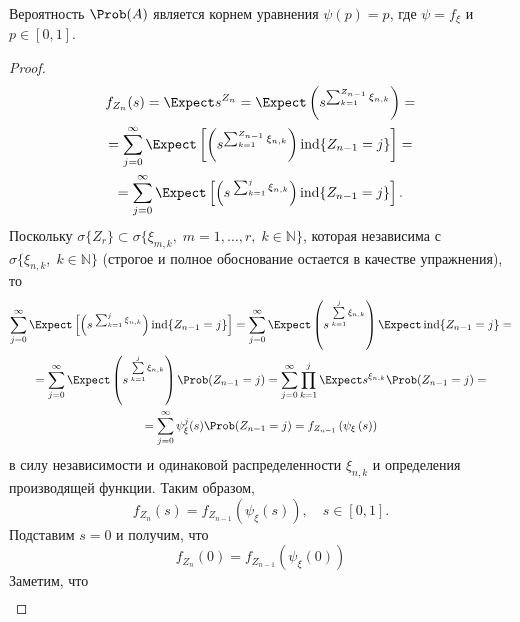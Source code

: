 \begin{lem}
  \label{lem1}
  Вероятность $\Prob(A)$ является корнем уравнения $\psi(p) = p$, где $\psi = f_{\xi}$ и $p \in [0, 1]$.
\end{lem}

\begin{proof}

  \begin{multline*}
    f_{Z_{n}}(s) = \Expect s^{Z_{n}} = \Expect \left(s^{\sum_{k=1}^{Z_{n-1}} \xi_{n, k}}\right) =\\
    = \sum_{j=0}^{\infty} \Expect \left[ \left( s^{\sum_{k=1}^{Z_{n-1}} \xi_{n, k}} \right)  \ind \lbrace Z_{n-1} = j \rbrace \right] = \\ = \sum_{j=0}^{\infty} \Expect \left[ \left( s \: ^{\sum_{k=1}^{j} \xi_{n, k}} \right)  \ind \lbrace Z_{n-1} = j \rbrace \right].
  \end{multline*}
  Поскольку $\sigma \lbrace Z_{r} \rbrace \subset \sigma \lbrace \xi_{m, k}, \; m = 1, \ldots, r, \; k \in \mathbb{N} \rbrace$, которая независима с $\sigma \lbrace \xi_{n, k}, \; k \in \mathbb{N} \rbrace$ (строгое и полное обоснование остается в качестве упражнения), то
  \begin{multline*}
    \sum_{j=0}^{\infty} \Expect \left[ \left( s \: ^{\sum_{k=1}^{j} \xi_{n, k}} \right)  \ind \lbrace Z_{n-1} = j \rbrace \right]  =  \sum\limits_{j=0}^{\infty} \Expect \left(s \: ^{\sum\limits_{k=1}^{j} \xi_{n, k}}\right) \Expect \ind \lbrace Z_{n-1} = j \rbrace  = \\ = \sum\limits_{j=0}^{\infty} \Expect \left(s \: ^{\sum\limits_{k=1}^{j} \xi_{n, k}}\right) \Prob ( Z_{n-1} = j ) = \sum\limits_{j=0}^{\infty} \prod\limits_{k=1}^{j} \Expect s^{\xi_{n, k}} \Prob (Z_{n-1} = j) = \\ = \sum\limits_{j=0}^{\infty} \psi_{\xi}^{j} (s) \Prob (Z_{n-1} = j)  =  f_{Z_{n-1}} \left(\psi_{\xi} \left(s \right) \right)
  \end{multline*}
  в силу независимости и одинаковой распределенности $\xi_{n, k}$ и определения производящей функции. Таким образом,
  \begin{equation*}
    f_{Z_{n}} (s) = f_{Z_{n-1}} \left( \psi_{\xi} \left(s \right)\right){,}\quad s \in [0, 1]{.}
  \end{equation*}
  Подставим $s = 0$ и получим, что
  \begin{equation*}
    f_{Z_{n}} (0) = f_{Z_{n-1}} \left( \psi_{\xi} \left(0 \right)\right)
  \end{equation*}
  Заметим, что
  \begin{multline*}

\end{multline*}
\end{proof}
